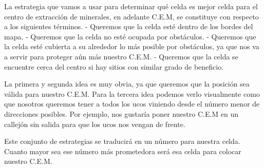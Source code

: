 La estrategia que vamos a usar para determinar qué celda es mejor celda para el centro de extracción de minerales, en adelante C.E.M, se constituye con respecto a los siguientes términos.\newline
- Queremos que la celda esté dentro de los bordes del mapa.\newline
- Queremos que la celda no esté ocupada por obstáculos. \newline
- Queremos que la celda esté cubierta a su alrededor lo más posible por obstáculos, ya que nos va a servir para proteger aún más nuestro C.E.M.\newline
- Queremos que la celda se encuentre cerca del centro si hay sitios con similar grado de beneficio.\newline

La primera y segunda idea es muy obvia, ya que queremos que la posición sea válida para nuestro C.E.M.
Para la tercera idea podemos verlo visualmente como que nosotros queremos tener a todos los ucos viniendo desde el número menor de direcciones posibles. Por ejemplo, nos gustaría poner nuestro C.E.M en un callejón sin salida para que los ucos nos vengan de frente.

Este conjunto de estrategias se traducirá en un número para nuestra celda. Cuanto mayor sea ese número más prometedora será esa celda para colocar nuestro C.E.M.

